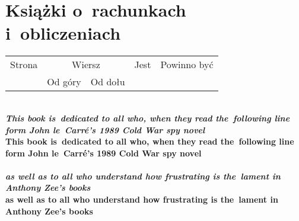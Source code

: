 \documentclass[a4paper,11pt]{article}
\begin{document}
\vspace{\spaceTwo}
















\newpage

\section{Książki o~rachunkach i~obliczeniach}

\vspace{\spaceTwo}




\vspace{0em}




\begin{center}

  \begin{tabular}{|c|c|c|c|c|}
    \hline
    Strona & \multicolumn{2}{c|}{Wiersz} & Jest
                              & Powinno być \\ \cline{2-3}
    & Od góry & Od dołu & & \\
    \hline
    \hline
  \end{tabular}

\end{center}

\vspace{\spaceTwo}


\noindent
{} \\
\Jest  \textbf{\textit{This book is~dedicated to all who, when they read
    the~following line form John le~Carr\'{e}'s 1989 Cold War spy
    novel}} \\
\Powin \textbf{This book is~dedicated to all who, when they read
  the~following line form John le~Carr\'{e}'s 1989 Cold War spy
  novel} \\
 \\
\Jest  \textbf{\textit{as well as to all who understand how frustrating is
    the~lament in Anthony Zee's books}} \\
\Powin \textbf{as well as to all who understand how frustrating is
  the~lament in Anthony Zee's books} \\
\end{document}
